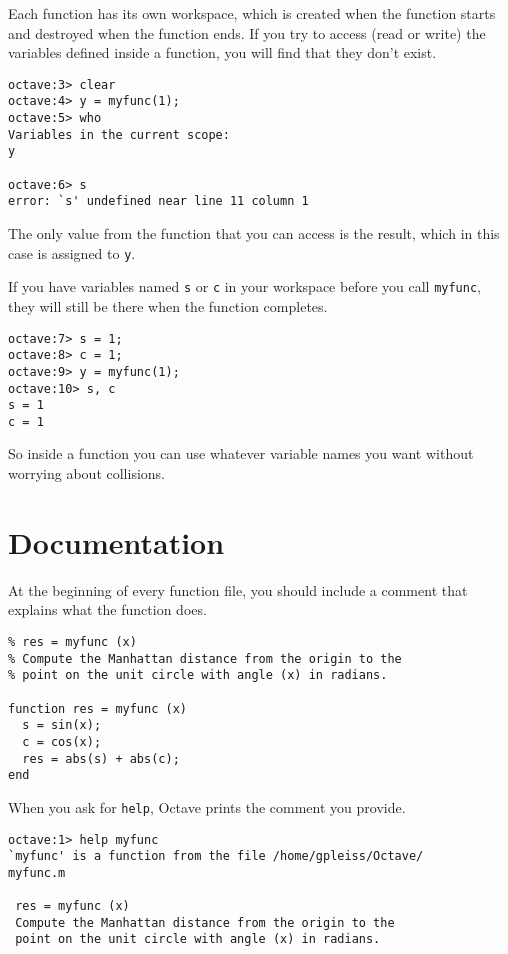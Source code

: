 Each function has its own workspace, which is created when the
function starts and destroyed when the function ends. If you try to
access (read or write) the variables defined inside a function, you
will find that they don't exist.

\begin{verbatim}
octave:3> clear
octave:4> y = myfunc(1);
octave:5> who
Variables in the current scope:
y

octave:6> s
error: `s' undefined near line 11 column 1
\end{verbatim}

The only value from the function that you can access is the result,
which in this case is assigned to {\tt y}.

If you have variables named {\tt s} or {\tt c} in your workspace
before you call {\tt myfunc}, they will still be there when the
function completes.

\begin{verbatim}
octave:7> s = 1;
octave:8> c = 1;
octave:9> y = myfunc(1);
octave:10> s, c
s = 1
c = 1
\end{verbatim}

So inside a function you can use whatever variable names you
want without worrying about collisions.


\section{Documentation}

At the beginning of every function file, you should include a comment
that explains what the function does.

\begin{verbatim}
% res = myfunc (x)
% Compute the Manhattan distance from the origin to the
% point on the unit circle with angle (x) in radians.

function res = myfunc (x)
  s = sin(x);
  c = cos(x);
  res = abs(s) + abs(c);
end
\end{verbatim}

When you ask for {\tt help}, Octave prints the comment you
provide.

\begin{verbatim}
octave:1> help myfunc
`myfunc' is a function from the file /home/gpleiss/Octave/
myfunc.m

 res = myfunc (x)
 Compute the Manhattan distance from the origin to the
 point on the unit circle with angle (x) in radians.
\end{verbatim}

